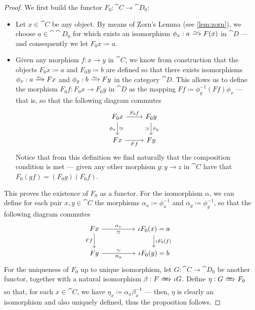 \begin{proof}
We first build the functor \(F_0: \cat C \to \cat D_0\):
\begin{itemize}\setlength\itemsep{0em}
\item Let \(x \in \cat C\) be any object. By means of Zorn's Lemma (see
  \cref{lem:zorn}), we choose \(a \in \cat \cat D_0\) for which exists an
  isomorphism \(\phi_x: a \isoto F(x)\) in \(\cat D\) --- and consequently we let
  \(F_0 x \coloneq a\).
\item Given any morphism \(f: x \to y\) in \(\cat C\), we know from
  construction that the objects \(F_0 x \coloneq a\) and \(F_0 y \coloneq b\)
  are defined so that there exists isomorphisms \(\phi_x: a \isoto F x\) and
  \(\phi_y: b \isoto F y\) in the category \(\cat D\). This allows us to define
  the morphism \(F_0 f: F_0 x \to F_0 y\) in \(\cat D\) as the mapping
  \(F f \coloneq \phi_y^{-1} (F f) \phi_x\) --- that is, so that the following
  diagram commutes
  \[
    \begin{tikzcd}
      F_0 x \ar[r, "F_0 f"] \ar[d, "\dis", "\phi_x"']
      &F_0 y \ar[d, "\dis"', "\phi_y"] \\
      F x \ar[r, swap, "F f"] &F y
    \end{tikzcd}
  \]
  Notice that from this definition we find naturally that the composition
  condition is met --- given any other morphism \(g: y \to z\) in \(\cat C\)
  have that \(F_0(g f) = (F_0 g)(F_0 f)\).
\end{itemize}
This proves the existence of \(F_0\) as a functor. For the isomorphism
\(\alpha\), we can define for each pair \(x, y \in \cat C\) the morphisms
\(\alpha_x \coloneq \phi_x^{-1}\) and \(\alpha_y \coloneq \phi_y^{-1}\), so that
the following diagram commutes
\[
  \begin{tikzcd}
    F x \ar[rr, "\alpha_x", "\dis"'] \ar[d, swap, "F f"]
    & &\iota F_0(x) = a \ar[d, "\iota F_0 (f)"] \\
    F y \ar[rr, "\alpha_y"', "\dis"]
    & &\iota F_0(y) = b
  \end{tikzcd}
\]
For the uniqueness of \(F_0\) up to unique isomorphism, let
\(G: \cat C \to \cat D_0\) be another functor, together with a natural
isomorphism \(\beta: F \isonat \iota G\). Define \(\eta: G \isonat F_0\) so
that, for each \(x \in \cat C\), we have
\(\eta_x \coloneq \alpha_x \beta_{x}^{-1}\) --- then, \(\eta\) is clearly an
isomorphism and also uniquely defined, thus the proposition follows.
\end{proof}

